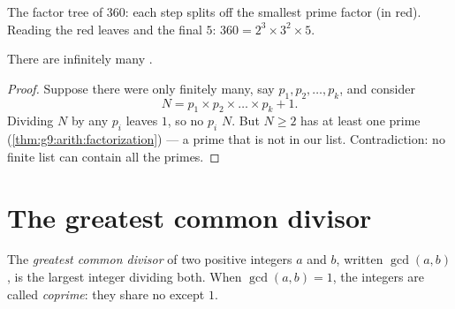 \begin{omfigure}

{\small The factor tree of $360$: each step splits off the smallest prime
factor (in red). Reading the red leaves and the final $5$:
$360 = 2^3 \times 3^2 \times 5$.}
\end{omfigure}

\begin{theorem}[Euclid]\label{thm:g9:arith:euclid}
There are infinitely many .
\end{theorem}

\begin{proof}
Suppose there were only finitely many, say $p_1, p_2, \dots, p_k$, and
consider
\[
N = p_1 \times p_2 \times \dots \times p_k + 1 .
\]
Dividing $N$ by any $p_i$ leaves  $1$, so no $p_i$  $N$.
But $N \geq 2$ has at least one prime 
(\cref{thm:g9:arith:factorization}) --- a prime that is not in our list.
Contradiction: no finite list can contain all the primes.
\end{proof}

\section{The greatest common divisor}

\begin{definition}[GCD]\label{def:g9:arith:gcd}
The \emph{greatest common divisor} of two
positive integers $a$ and $b$, written $\gcd(a, b)$, is the largest
integer dividing both. When $\gcd(a, b) = 1$, the integers are called
\emph{coprime}: they share no  except $1$.
\end{definition}

